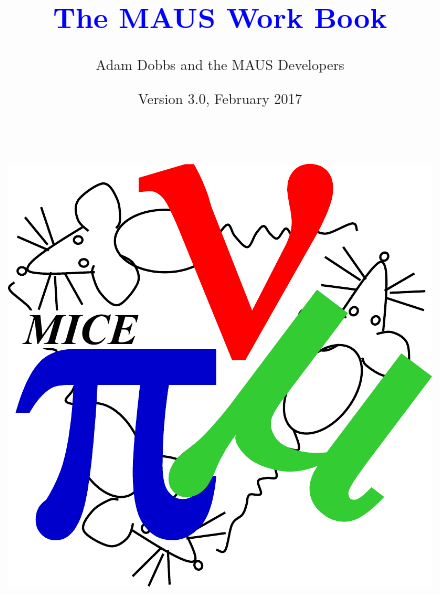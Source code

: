 \documentclass[a4paper,10pt]{article}
\title{\textcolor{blue}{The MAUS Work Book}}
\author{Adam Dobbs and the MAUS Developers}
\date{Version 3.0, February 2017}
\begin{document}
\thispagestyle{empty}

\vspace*{1cm}

{\let\newpage\relax\maketitle}

\reversemarginpar

\thispagestyle{empty}
\vspace{2cm}

\begin{figure}[h]
 \begin{center}
   \includegraphics[width=0.29\linewidth]{./graphics/mice-logo.pdf}
 \end{center}
\end{figure}

\vspace{5cm}

\pagebreak

\tableofcontents

\pagebreak
\end{document}
